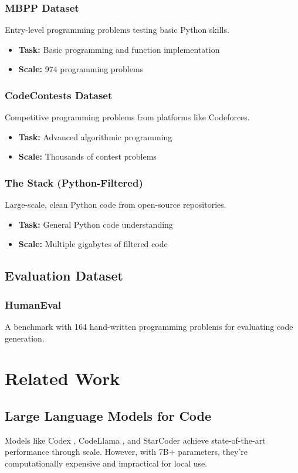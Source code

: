 \documentclass[preprint,12pt]{elsarticle}
\begin{document}
\subsubsection{MBPP Dataset}
Entry-level programming problems testing basic Python skills.
\begin{itemize}
\item \textbf{Task:} Basic programming and function implementation
\item \textbf{Scale:} 974 programming problems
\end{itemize}

\subsubsection{CodeContests Dataset}
Competitive programming problems from platforms like Codeforces.
\begin{itemize}
\item \textbf{Task:} Advanced algorithmic programming
\item \textbf{Scale:} Thousands of contest problems
\end{itemize}

\subsubsection{The Stack (Python-Filtered)}
Large-scale, clean Python code from open-source repositories.
\begin{itemize}
\item \textbf{Task:} General Python code understanding
\item \textbf{Scale:} Multiple gigabytes of filtered code
\end{itemize}

\subsection{Evaluation Dataset}

\subsubsection{HumanEval}
A benchmark with 164 hand-written programming problems for evaluating code generation.

\section{Related Work}

\subsection{Large Language Models for Code}
Models like Codex \citep{chen2021codex}, CodeLlama \citep{roziere2023codellama}, and StarCoder \citep{li2023starcoder} achieve state-of-the-art performance through scale. However, with 7B+ parameters, they're computationally expensive and impractical for local use.
\end{document}

